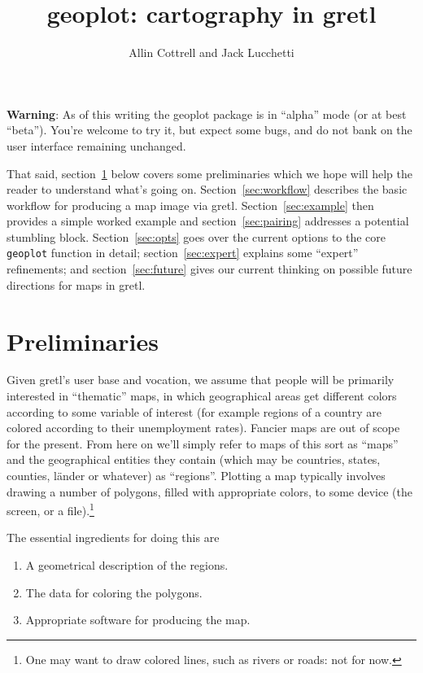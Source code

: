 \documentclass{article}
\title{geoplot: cartography in gretl}
\author{Allin Cottrell and Jack Lucchetti}
\begin{document}
\maketitle

\textbf{Warning}: As of this writing the \textsf{geoplot} package is
in ``alpha'' mode (or at best ``beta''). You're welcome to try it, but
expect some bugs, and do not bank on the user interface remaining
unchanged.

That said, section~\ref{sec:prelim} below covers some preliminaries
which we hope will help the reader to understand what's going
on. Section~\ref{sec:workflow} describes the basic workflow for
producing a map image via gretl. Section~\ref{sec:example} then
provides a simple worked example and section~\ref{sec:pairing}
addresses a potential stumbling block. Section~\ref{sec:opts} goes
over the current options to the core \texttt{geoplot} function in
detail; section~\ref{sec:expert} explains some ``expert'' refinements;
and section~\ref{sec:future} gives our current thinking on possible
future directions for maps in gretl.

\section{Preliminaries}
\label{sec:prelim}

Given gretl's user base and vocation, we assume that people will be
primarily interested in ``thematic'' maps, in which geographical areas
get different colors according to some variable of interest (for
example regions of a country are colored according to their
unemployment rates). Fancier maps are out of scope for the
present. From here on we'll simply refer to maps of this sort as
``maps'' and the geographical entities they contain (which may be
countries, states, counties, l\"ander or whatever) as
``regions''. Plotting a map typically involves drawing a number of
polygons, filled with appropriate colors, to some device (the screen,
or a file).\footnote{One may want to draw colored lines, such as
  rivers or roads: not for now.}

The essential ingredients for doing this are
\begin{enumerate}
   \item A geometrical description of the regions.
   \item The data for coloring the polygons.
   \item Appropriate software for producing the map.
\end{enumerate}
\end{document}
